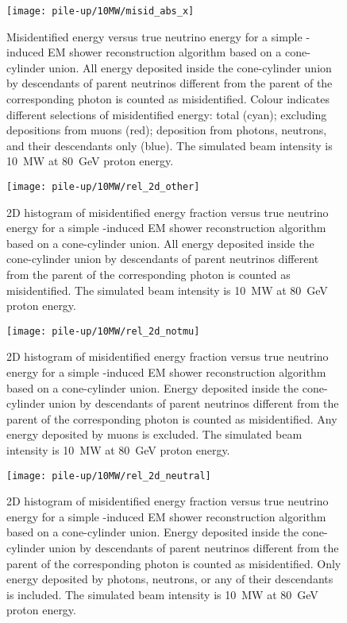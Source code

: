 \begin{figure}[htb]
	\centering
	\texttt{[image: pile-up/10MW/misid\_abs\_x]}
	\caption{Misidentified energy versus true neutrino energy for a simple \Pgpz-induced EM shower reconstruction algorithm based on a cone-cylinder union.
		All energy deposited inside the cone-cylinder union by descendants of parent neutrinos different from the parent of the corresponding \Pgpz photon is counted as misidentified.
		Colour indicates different selections of misidentified energy: total (cyan); excluding depositions from muons (red); deposition from photons, neutrons, and their descendants only (blue).
		The simulated beam intensity is \SI{10}{\mega\watt} at \SI{80}{\giga\electronvolt} proton energy.}
\end{figure}

\begin{figure}[htb]
	\centering
	\texttt{[image: pile-up/10MW/rel\_2d\_other]}
	\caption{2D histogram of misidentified energy fraction versus true neutrino energy for a simple \Pgpz-induced EM shower reconstruction algorithm based on a cone-cylinder union.
		All energy deposited inside the cone-cylinder union by descendants of parent neutrinos different from the parent of the corresponding \Pgpz photon is counted as misidentified.
		The simulated beam intensity is \SI{10}{\mega\watt} at \SI{80}{\giga\electronvolt} proton energy.}
\end{figure}

\begin{figure}[htb]
	\centering
	\texttt{[image: pile-up/10MW/rel\_2d\_notmu]}
	\caption{2D histogram of misidentified energy fraction versus true neutrino energy for a simple \Pgpz-induced EM shower reconstruction algorithm based on a cone-cylinder union.
		Energy deposited inside the cone-cylinder union by descendants of parent neutrinos different from the parent of the corresponding \Pgpz photon is counted as misidentified.
		Any energy deposited by muons is excluded.
		The simulated beam intensity is \SI{10}{\mega\watt} at \SI{80}{\giga\electronvolt} proton energy.}
\end{figure}

\begin{figure}[htb]
	\centering
	\texttt{[image: pile-up/10MW/rel\_2d\_neutral]}
	\caption{2D histogram of misidentified energy fraction versus true neutrino energy for a simple \Pgpz-induced EM shower reconstruction algorithm based on a cone-cylinder union.
		Energy deposited inside the cone-cylinder union by descendants of parent neutrinos different from the parent of the corresponding \Pgpz photon is counted as misidentified.
		Only energy deposited by photons, neutrons, or any of their descendants is included.
		The simulated beam intensity is \SI{10}{\mega\watt} at \SI{80}{\giga\electronvolt} proton energy.}
\end{figure}

